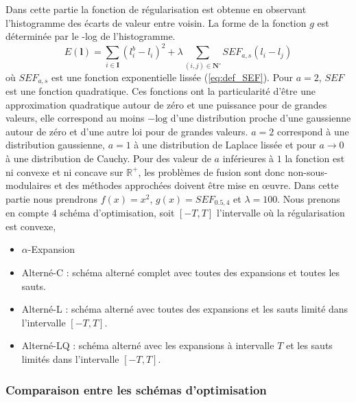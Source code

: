 \documentclass[../main/These_Mathias_Paget.tex]{subfiles}
\begin{document}
Dans cette partie la fonction de régularisation est obtenue en observant l'histogramme des écarts de valeur entre voisin. La forme de la fonction $g$ est déterminée par le -log de l'histogramme. 
\begin{equation}
E(\boldsymbol{l}) = \sum_{i \in \boldsymbol{I}}{ (l^b_i - l_i)^2} + 
\lambda \sum_{(i,j) \in \boldsymbol{N'}}{ SEF_{a,s}(l_i-l_j) }
\end{equation}
où $SEF_{a,s}$ est une fonction exponentielle lissée (\ref{eq:def_SEF}). Pour $a=2$, $SEF$ est une fonction quadratique. Ces fonctions ont la particularité d'être une approximation quadratique autour de zéro et une puissance pour de grandes valeurs, elle correspond au moins $-\text{log}$ d'une distribution proche d'une gaussienne autour de zéro et d'une autre loi pour de grandes valeurs. $a=2$ correspond à une distribution gaussienne, $a=1$ à une distribution de Laplace lissée et pour $a \rightarrow 0$ à une distribution de Cauchy. Pour des valeur de $a$ inférieures à $1$ la fonction est ni convexe et ni concave sur $\mathbb{R}^+$, les problèmes de fusion sont donc non-sous-modulaires et des méthodes approchées doivent être mise en œuvre. Dans cette partie nous prendrons $f(x)=x^2$, $g(x)=SEF_{0.5,4}$ et $\lambda=100$. Nous prenons en compte 4 schéma d'optimisation, soit $[-T, T]$ l'intervalle où la régularisation est convexe,
\begin{itemize}
\item $\alpha$-Expansion
\item Alterné-C : schéma alterné complet avec toutes des expansions et toutes les sauts.
\item Alterné-L : schéma alterné avec toutes des expansions et les sauts limité dans l'intervalle $[-T, T]$.
\item Alterné-LQ : schéma alterné avec les expansions à intervalle $T$ et les sauts limités dans l'intervalle $[-T, T]$.
\end{itemize}

\subsubsection{Comparaison entre les schémas d'optimisation}
\end{document}
